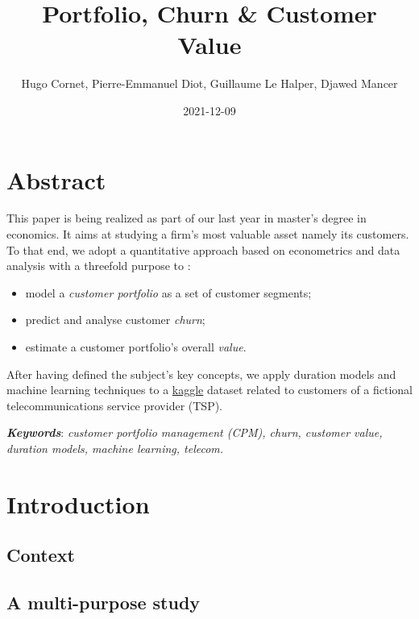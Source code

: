\documentclass[
]{book}
\title{Portfolio, Churn \& Customer Value}
\author{Hugo Cornet, Pierre-Emmanuel Diot, Guillaume Le Halper, Djawed Mancer}
\date{2021-12-09}
\providecommand{\tightlist}{%
  \setlength{\itemsep}{0pt}\setlength{\parskip}{0pt}}
\begin{document}
\maketitle

{
\setcounter{tocdepth}{1}
\tableofcontents
}
\hypertarget{abstract}{%
\chapter*{Abstract}\label{abstract}}

This paper is being realized as part of our last year in master's degree in economics. It aims at studying a firm's most valuable asset namely its customers. To that end, we adopt a quantitative approach based on econometrics and data analysis with a threefold purpose to :

\begin{itemize}
\tightlist
\item
  model a \emph{customer portfolio} as a set of customer segments;
\item
  predict and analyse customer \emph{churn};
\item
  estimate a customer portfolio's overall \emph{value}.
\end{itemize}

After having defined the subject's key concepts, we apply duration models and machine learning techniques to a \href{https://www.kaggle.com/yeanzc/telco-customer-churn-ibm-dataset}{kaggle} dataset related to customers of a fictional telecommunications service provider (TSP).

\textbf{\emph{Keywords}}: \emph{customer portfolio management (CPM), churn, customer value, duration models, machine learning, telecom.}

\hypertarget{intro}{%
\chapter{Introduction}\label{intro}}

\hypertarget{context}{%
\section{Context}\label{context}}

\hypertarget{a-multi-purpose-study}{%
\section{A multi-purpose study}\label{a-multi-purpose-study}}
\end{document}
